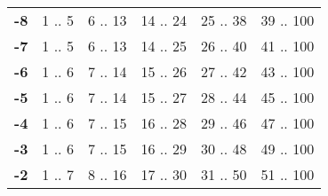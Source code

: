 \documentclass[oneside]{book}
\begin{document}
\begin{table}[h]
\begin{tabular}{lccccc}
\rowcolor[HTML]{FFFFFF} 
\textbf{-8}                                & {\color[HTML]{333333} 1 .. 5}                             & 6 .. 13                            & 14 .. 24                                               & 25 .. 38                                               & 39 .. 100                                              \\
\rowcolor[HTML]{EFEFEF} 
\textbf{-7}                                & {\color[HTML]{333333} 1 .. 5}                             & 6 .. 13                            & 14 .. 25                                               & 26 .. 40                                               & 41 .. 100                                              \\
\rowcolor[HTML]{FFFFFF} 
\textbf{-6}                                & {\color[HTML]{333333} 1 .. 6}                             & 7 .. 14                            & 15 .. 26                                               & 27 .. 42                                               & 43 .. 100                                              \\
\rowcolor[HTML]{EFEFEF} 
\textbf{-5}                                & {\color[HTML]{333333} 1 .. 6}                             & 7 .. 14                            & 15 .. 27                                               & 28 .. 44                                               & 45 .. 100                                              \\
\rowcolor[HTML]{FFFFFF} 
\textbf{-4}                                & {\color[HTML]{333333} 1 .. 6}                             & 7 .. 15                            & 16 .. 28                                               & 29 .. 46                                               & 47 .. 100                                              \\
\rowcolor[HTML]{EFEFEF} 
\textbf{-3}                                & {\color[HTML]{333333} 1 .. 6}                             & 7 .. 15                            & 16 .. 29                                               & 30 .. 48                                               & 49 .. 100                                              \\
\rowcolor[HTML]{FFFFFF} 
\textbf{-2}                                & {\color[HTML]{333333} 1 .. 7}                             & 8 .. 16                            & 17 .. 30                                               & 31 .. 50                                               & 51 .. 100                                              \\

\end{tabular}
\end{table}
\end{document}

